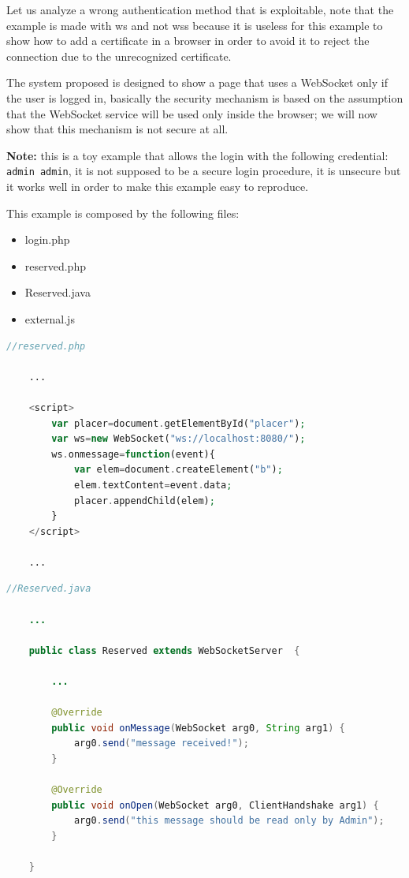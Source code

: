 	Let us analyze a wrong authentication method that is exploitable, note that the example is made with ws and not wss because it is useless for this example to show how to add a certificate in a browser in order to avoid it to reject the connection due to the unrecognized certificate.\newline
	
	The system proposed is designed to show a page that uses a WebSocket only if the user is logged in, basically the security mechanism is based on the assumption that the WebSocket service will be used only inside the browser; we will now show that this mechanism is not secure at all.
	
	\textbf{Note:} this is a toy example that allows the login with the following credential: \texttt{admin admin}, it is not supposed to be a secure login procedure, it is unsecure but it works well in order to make this example easy to reproduce.
	
		This example is composed by the following files:
	\begin{itemize}
		\item login.php
		\item reserved.php
		\item Reserved.java
		\item external.js
	\end{itemize}
		
	\begin{lstlisting}[language=php]
	//reserved.php
	
	...
	
	<script>
		var placer=document.getElementById("placer");
		var ws=new WebSocket("ws://localhost:8080/");
		ws.onmessage=function(event){
			var elem=document.createElement("b");
			elem.textContent=event.data;
			placer.appendChild(elem);
		}
	</script>
	
	...

	\end{lstlisting}
	
	\begin{lstlisting}[language=Java]
	//Reserved.java

	...

	public class Reserved extends WebSocketServer  {
		
		...
		
		@Override
		public void onMessage(WebSocket arg0, String arg1) {
			arg0.send("message received!");
		}
		
		@Override
		public void onOpen(WebSocket arg0, ClientHandshake arg1) {
			arg0.send("this message should be read only by Admin");
		}

	}
	
	\end{lstlisting}
	
